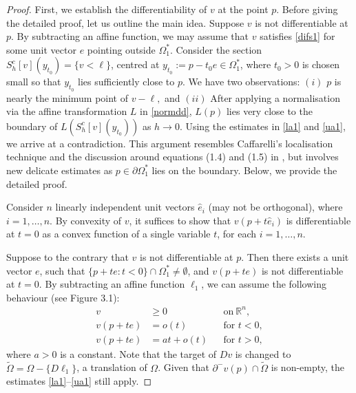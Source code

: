 \documentclass[10pt,a4paper]{amsart}
\theoremstyle{plain}
\newcommand{\0}{\textbf{0}}
\numberwithin{equation}{section}
\numberwithin{equation}{section}
\numberwithin{figure}{section}
\begin{document}
\begin{proof}

First, we establish the differentiability of \( v \) at the point \( p \).
Before giving the detailed proof, let us outline the main idea. Suppose \( v \) is not differentiable at \( p \). By subtracting an affine function, we may assume that $v$ satisfies \eqref{difs1} for some unit vector $e$ pointing outside $\Omega^*_1$. Consider the section \( S^c_h[v](y_{t_0}) = \{ v < \ell \} \), centred at \( y_{t_0} := p - t_0 e \in\Omega^*_1 \), where $t_0>0$ is chosen small so that $y_{t_0}$ lies sufficiently close to $p$. We have two observations: $(i)$  $p$ is nearly the minimum point of $v-\ell,$ and $(ii)$ After applying a normalisation via the affine transformation \( L \) in \eqref{normdd}, \( L(p) \) lies very close to the boundary of \( L\left(S^c_h[v](y_{t_0})\right) \) as $h\to0$. Using the estimates in \eqref{la1} and \eqref{ua1}, we arrive at a contradiction. This argument resembles Caffarelli's localisation technique and the discussion around equations (1.4) and (1.5) in \cite{GK}, but involves new delicate estimates  as $p\in\partial\Omega^*_1$ lies on the boundary. Below, we provide the detailed proof.  


Consider \( n \) linearly independent unit vectors \( \hat{e}_i \) (may not be orthogonal), where \( i = 1, \ldots, n \). 
By convexity of $v$, it suffices to show that \( v(p + t\hat{e}_i) \) is differentiable at \( t = 0 \) as a convex function of a single variable \( t \), for each \( i = 1, \ldots, n \).

Suppose to the contrary that \( v \) is not differentiable at \( p \). Then there exists a unit vector \( e \), such that \( \{p + te : t < 0\} \cap \Omega_1^* \neq \emptyset\), and \( v(p + te) \) is not differentiable at \( t = 0 \). By subtracting an affine function \( \ell_1 \), we can assume the following behaviour (see Figure 3.1):
\begin{equation}\label{difs1}
\begin{aligned}
v &\geq 0&& \text{on}\ \mathbb{R}^n,\\
v(p + te) &= o(t) && \text{for } t < 0, \\
v(p + te) &= at + o(t) && \text{for } t > 0,
\end{aligned}
\end{equation}
where \( a>0 \) is a constant. 
Note that the target of \( Dv \) is changed to \( \tilde{\Omega} = \Omega - \{D\ell_1\} \), a translation of \( \Omega \).
Given that \( \partial^{-}v(p) \cap \tilde{\Omega} \) is non-empty, the estimates \eqref{la1}--\eqref{ua1} still apply.  


\end{proof}
\end{document}
